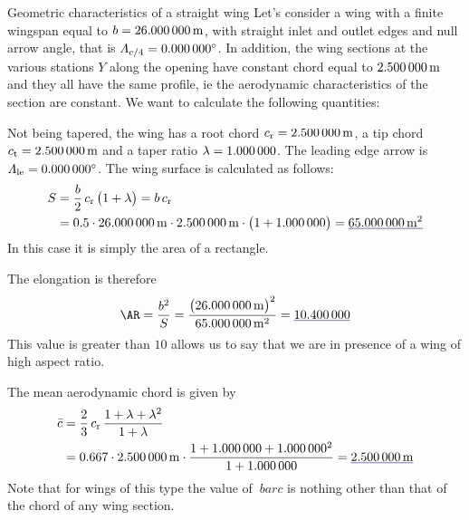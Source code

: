 \documentclass[[12pt,twoside]{book}
\begin{document}
%

%


\begin{myExampleX}{Geometric characteristics of a straight wing}{}%
\label{example:Wing:Basic:AA}
%
\noindent
Let's consider a wing with a finite wingspan equal to $b=\SI[round-precision=1]{\mySpanWingMT}{\metre}$,
with straight inlet and outlet edges and
null arrow angle, that is $\Lambda_{c/4}=\SI[round-precision=1]{\myLambdaCQuarter}{\degree}$.
In addition, the wing sections at the various stations $Y$ along the opening have constant chord
equal to $\SI[round-precision=2]{\myChordRootWingMT}{\metre}$
and they all have the same profile, ie the aerodynamic characteristics of the section are constant.
We want to calculate the following quantities:

\noindent
{}%

\medskip
\noindent
Not being tapered, the wing has a root chord
$c_\mathrm{r}=\SI[round-precision=2]{\myChordRootWingMT}{\metre}$,
a tip chord $c_\mathrm{t}=\SI[round-precision=2]{\myChordTipWingMT}{\metre}$
and a taper ratio $\lambda=\SI[round-precision=0]{\myTaperRatioWing}{}$.
The leading edge arrow is
 $\Lambda_\mathrm{le}=\SI[round-precision=0]{\myLambdaCQuarter}{\degree}$.
\noindent
The wing surface is calculated as follows:
\[
\begin{split}
S & {}= \frac{b}{2} \, c_\mathrm{r} \, \big( 1 + \lambda \big) = b\,c_\mathrm{r}\\
  & {}=
    \num{0.5} \cdot \SI[round-precision=1]{\mySpanWingMT}{\metre}
      \cdot \SI[round-precision=2]{\myChordRootWingMT}{\metre}
      \cdot \big( 1 + \SI[round-precision=2]{\myTaperRatioWing}{} \big) 
    = \mathunderline{mydarkblue}{ \SI[round-precision=1]{\myAreaWingMTsquared}{\metre^2} }
\end{split}
\]
In this case it is simply the area of a rectangle.

The elongation is therefore
\[
\AR 
  = \frac{b^2}{S}
  = \frac{\big(\SI[round-precision=1]{\mySpanWingMT}{\metre}\big)^2}{\SI[round-precision=1]{\myAreaWingMTsquared}{\metre^2}}
  = \mathunderline{mydarkblue}{ \num[round-precision=2]{\myAspectRatioWing} }
\]
This value is greater than $\num[round-precision=0]{10}$ allows us to say that we are in
presence of a wing of high aspect ratio.

The mean aerodynamic chord is given by
 
\[
\begin{split}
\bar{c} & {}= \frac{2}{3} \, c_\mathrm{r} \, \frac{1+\lambda + \lambda^2}{1+\lambda} \\
  & {}=
    \num{0.667} \cdot \SI[round-precision=2]{\myChordRootWingMT}{\metre}
      \cdot 
        \frac{
          1 + \SI[round-precision=2]{\myTaperRatioWing}{} + \SI[round-precision=2]{\myTaperRatioWing}{}^2
        }{
          1 + \SI[round-precision=2]{\myTaperRatioWing}{}
        }
    = \mathunderline{mydarkblue}{ \SI[round-precision=2]{\myMACWingMT}{\metre} }
\end{split}
\]
Note that for wings of this type the value of $ \ bar {c} $ is nothing other than that of the chord
of any wing section.


\end{myExampleX}
\end{document}
